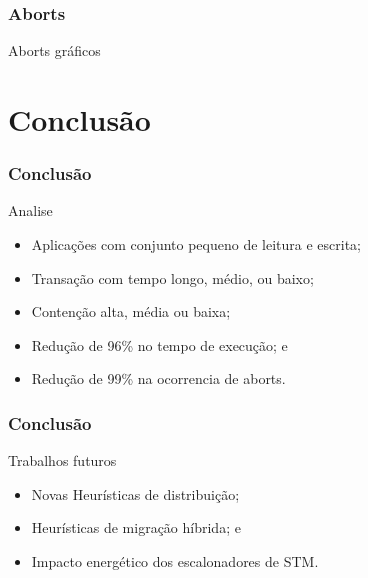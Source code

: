 \documentclass[10pt, pdf,xcolor=pdftex,dvipsnames,table]{beamer}
\begin{document}
\begin{frame} \frametitle{Aborts}
    \begin{block}{Aborts}
        gráficos
    \end{block}
\end{frame}

\section{Conclusão}
\begin{frame} \frametitle{Conclusão}
    \begin{block}{Analise}
        \begin{itemize}
        	\item Aplicações com conjunto pequeno de leitura e escrita;
        	\item Transação com tempo longo, médio, ou baixo;
        	\item Contenção alta, média ou baixa;
        	\item Redução de 96\% no tempo de execução; e
        	\item Redução de 99\% na ocorrencia de aborts.
        \end{itemize}
    \end{block}
\end{frame}

\begin{frame} \frametitle{Conclusão}
    \begin{block}{Trabalhos futuros}
        \begin{itemize}
        	\item Novas Heurísticas de distribuição;
        	\item Heurísticas de migração híbrida; e
        	\item Impacto energético dos escalonadores de STM.
        \end{itemize}
    \end{block}
\end{frame}

\end{document}

